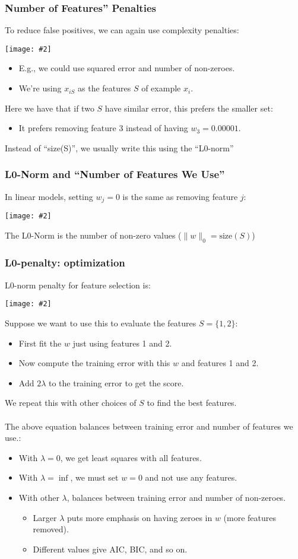 \documentclass{article}
\def\red#1{{\color{red}#1}}
\def\norm#1{\|#1\|}
\theoremstyle{definition}
\newcommand{\centerfig}[2]{\begin{center}\texttt{[image: \#2]}\end{center}}
\begin{document}
\subsubsection*{Number of Features” Penalties}
To reduce false positives, we can again use complexity penalties:
\centerfig{0.75}{comp-pen-1}
\begin{itemize}[label = -]
	\item E.g., we could use squared error and number of non-zeroes. 
	\item We’re using $ x_{iS} $ as the features $ S $ of example $ x_i $.
\end{itemize}
Here we have that if two $ S $ have similar error, this prefers the smaller set:
\begin{itemize}[label=-]
	\item It prefers removing feature 3 instead of having $ w_3 = 0.00001 $.
\end{itemize}
Instead of “size(S)”, we usually write this using the “L0-norm”

\subsubsection*{L0-Norm and “Number of Features We Use”}
In linear models, \red{setting $ w_j = 0 $ is the same as removing feature $ j $}:
\centerfig{0.65}{L0-norm-1}
The L0-Norm is the number of non-zero values ($ \norm{w}_0 = \text{size}(S) $)


\subsubsection*{L0-penalty: optimization}
L0-norm penalty for feature selection is:
\centerfig{0.5}{L0-norm-2}
Suppose we want to use this to evaluate the features $ S=\{1,2\} $: 
\begin{itemize}
	\item First fit the $ w $ just using features 1 and 2.
	\item Now compute the training error with this $ w $ and features 1 and 2. 
	\item Add $ 2 \lambda $ to the training error to get the score.
\end{itemize}
We repeat this with other choices of $ S $ to find the best features. \\ \\
The above equation balances between training error and number of features we use.:
\begin{itemize}
	\item With $ \lambda=0 $, we get least squares with all features.
	\item With $ \lambda = \inf $, we must set $ w=0 $ and not use any features.
	\item With other $\lambda$, balances between training error and number of non-zeroes.
	\begin{itemize}
		\item Larger $\lambda$ puts more emphasis on having zeroes in $ w $ (more features removed).
		\item Different values give AIC, BIC, and so on.
	\end{itemize}
\end{itemize}
\end{document}
